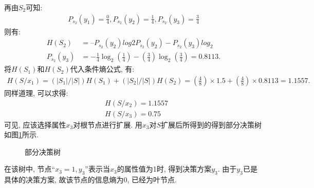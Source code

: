 再由$S_2$可知:
\begin{align}
  P_{s_2}(y_1)=\frac 0 4, P_{s_2}(y_2)=\frac 1 4, P_{s_2}(y_3)=\frac 3 4
\end{align}
则有:
\begin{align}
    H(S_2)&=– P_{s_2}(y_2)log2 P_{s_2}(y_2 )- P_{s_2}(y_3)log_2\\
    P_{s_2}(y_3)&=-\frac 1 4\log_2\left(\frac 1 4\right)- \left(\frac 3 4\right)\log_2\left(\frac 3 4\right) =0.8113.
\end{align}
将$H(S_1)$和$H(S_2)$代入条件熵公式, 有:
\begin{align}
    H(S/x_1)=(|S_1|/|S|)H(S_1)+ (|S_2|/|S|)H(S_2)=\left(\frac 4 8\right)\times 1.5+\left(\frac 4 8\right)\times 0.8113 =1.1557.
\end{align}
同样道理, 可以求得:
\begin{align}
  &H(S/x_2)=1.1557\\
  &H(S/x_3)=0.75
\end{align}
可见, 应该选择属性$x_3$对根节点进行扩展. 用$x_3$对$S$扩展后所得到的得到部分决策树如图\ref{bufenjueceshu2019112901}所示.
\begin{figure}[H]
\begin{center}
\caption{部分决策树}
\label{bufenjueceshu2019112901}
\end{center}
\end{figure}
在该树中, 节点“$x_3=1, y_3$”表示当$x_3$的属性值为1时, 得到决策方案$y_3$. 由于$y_3$已是具体的决策方案, 故该节点的信息熵为0, 已经为叶节点.

